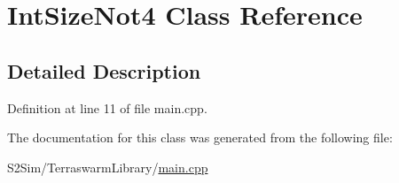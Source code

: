 \hypertarget{class_int_size_not4}{\section{Int\-Size\-Not4 Class Reference}
\label{class_int_size_not4}
}


\subsection{Detailed Description}


Definition at line 11 of file main.\-cpp.



The documentation for this class was generated from the following file\-:\begin{DoxyCompactItemize}
\item 
S2\-Sim/\-Terraswarm\-Library/\hyperlink{_terraswarm_library_2main_8cpp}{main.\-cpp}\end{DoxyCompactItemize}
